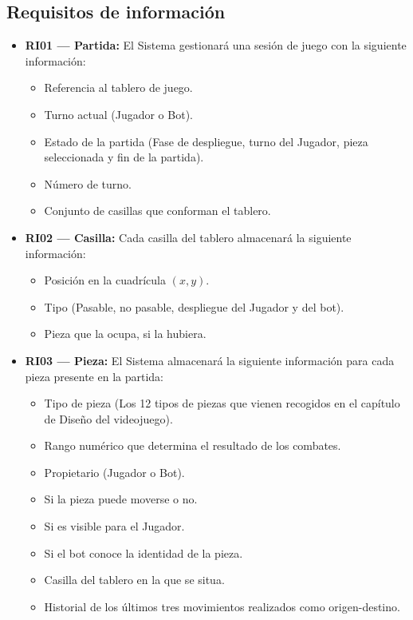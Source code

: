 \subsection{Requisitos de información}

\begin{itemize}
	\item \textbf{RI01 --- Partida:} El Sistema gestionará una sesión de juego con la siguiente información:
	\begin{itemize}
		\item Referencia al tablero de juego.
		\item Turno actual (Jugador o Bot).
		\item Estado de la partida (Fase de despliegue, turno del Jugador, pieza seleccionada y fin de la partida).
		\item Número de turno.
		\item Conjunto de casillas que conforman el tablero.
	\end{itemize}
	
	\item \textbf{RI02 --- Casilla:} Cada casilla del tablero almacenará la siguiente información:
	\begin{itemize}
		\item Posición en la cuadrícula $(x, y)$.
		\item Tipo (Pasable, no pasable, despliegue del Jugador y del bot).
		\item Pieza que la ocupa, si la	hubiera.
	\end{itemize}
	
\clearpage

	\item \textbf{RI03 --- Pieza:} El Sistema almacenará la siguiente información para cada pieza presente en la partida:
	\begin{itemize}
		\item Tipo de pieza (Los 12 tipos de piezas que vienen recogidos en el capítulo de Diseño del videojuego).
		\item Rango numérico que determina el resultado de los combates.
		\item Propietario (Jugador o Bot).
		\item Si la pieza puede moverse o no.
		\item Si es visible para el Jugador.
		\item Si el bot conoce la identidad de la pieza.
		\item Casilla del tablero en la que se situa.
		\item Historial de los últimos tres movimientos realizados como origen-destino.
	\end{itemize}
\end{itemize}

